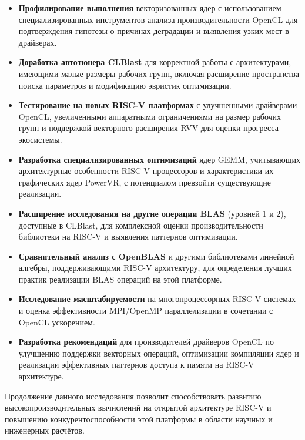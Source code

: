 \begin{itemize}
    \item \textbf{Профилирование выполнения} векторизованных ядер с использованием специализированных инструментов анализа производительности OpenCL для подтверждения гипотезы о причинах деградации и выявления узких мест в драйверах.
    
    \item \textbf{Доработка автотюнера CLBlast} для корректной работы с архитектурами, имеющими малые размеры рабочих групп, включая расширение пространства поиска параметров и модификацию эвристик оптимизации.
    
    \item \textbf{Тестирование на новых RISC-V платформах} с улучшенными драйверами OpenCL, увеличенными аппаратными ограничениями на размер рабочих групп и поддержкой векторного расширения RVV для оценки прогресса экосистемы.
    
    \item \textbf{Разработка специализированных оптимизаций} ядер GEMM, учитывающих архитектурные особенности RISC-V процессоров и характеристики их графических ядер PowerVR, с потенциалом превзойти существующие реализации.
    
    \item \textbf{Расширение исследования на другие операции BLAS} (уровней 1 и 2), доступные в CLBlast, для комплексной оценки производительности библиотеки на RISC-V и выявления паттернов оптимизации.
    
    \item \textbf{Сравнительный анализ с OpenBLAS} и другими библиотеками линейной алгебры, поддерживающими RISC-V архитектуру, для определения лучших практик реализации BLAS операций на этой платформе.
    
    \item \textbf{Исследование масштабируемости} на многопроцессорных RISC-V системах и оценка эффективности MPI/OpenMP параллелизации в сочетании с OpenCL ускорением.
    
    \item \textbf{Разработка рекомендаций} для производителей драйверов OpenCL по улучшению поддержки векторных операций, оптимизации компиляции ядер и реализации эффективных паттернов доступа к памяти на RISC-V архитектуре.
\end{itemize}

Продолжение данного исследования позволит способствовать развитию высокопроизводительных вычислений на открытой архитектуре RISC-V и повышению конкурентоспособности этой платформы в области научных и инженерных расчётов.